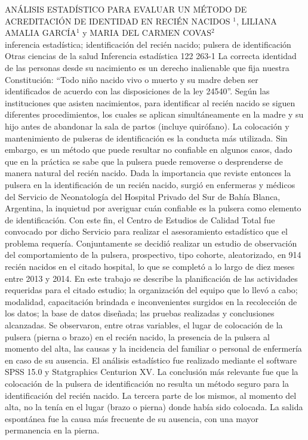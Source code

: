 \A
{ANÁLISIS ESTADÍSTICO PARA EVALUAR UN MÉTODO DE ACREDITACIÓN DE IDENTIDAD EN RECIÉN NACIDOS}
{$^1$, LILIANA AMALIA GARCÍA$^1$ y MARIA DEL CARMEN COVAS$^2$}
{
\\}
{inferencia estadística; identificación del recién nacido; pulsera de identificación} 
 {Otras ciencias de la salud} 
 {Inferencia estadística} 
 {122} 
 {263-1}
{La correcta identidad de las personas desde su nacimiento es un derecho inalienable que fija nuestra Constitución: “Todo niño nacido vivo o muerto y su madre deben ser identificados de acuerdo con las disposiciones de la ley 24540”. Según las instituciones que asisten nacimientos, para identificar al recién nacido se siguen diferentes procedimientos, los cuales se aplican simultáneamente en la madre y su hijo antes de abandonar la sala de partos (incluye quirófano). La colocación y mantenimiento de pulseras de identificación es la conducta más utilizada. Sin embargo, es un método que puede resultar no confiable en algunos casos, dado que en la práctica se sabe que la pulsera puede removerse o desprenderse de manera natural del recién nacido. Dada la importancia que reviste entonces la pulsera en la identificación de un recién nacido, surgió en enfermeras y médicos del Servicio de Neonatología del Hospital Privado del Sur de Bahía Blanca, Argentina, la inquietud por averiguar cuán confiable es la pulsera como elemento de identificación. Con este fin, el Centro de Estudios de Calidad Total fue convocado por dicho Servicio para realizar el asesoramiento estadístico que el problema requería. Conjuntamente se decidió realizar un estudio de observación del comportamiento de la pulsera, prospectivo, tipo cohorte, aleatorizado, en 914 recién nacidos en el citado hospital, lo que se completó a lo largo de diez meses entre 2013 y 2014. En este trabajo se describe la planificación de las actividades requeridas para el citado estudio; la organización del equipo que lo llevó a cabo; modalidad, capacitación brindada e inconvenientes surgidos en la recolección de los datos; la base de datos diseñada; las pruebas realizadas y conclusiones alcanzadas. Se observaron, entre otras variables, el lugar de colocación de la pulsera (pierna o brazo) en el recién nacido, la presencia de la pulsera al momento del alta, las causas y la incidencia del familiar o personal de enfermería en caso de su ausencia. El análisis estadístico fue realizado mediante el software SPSS 15.0 y Statgraphics Centurion XV. La conclusión más relevante fue que la colocación de la pulsera de identificación no resulta un método seguro para la identificación del recién nacido. La tercera parte de los mismos, al momento del alta, no la tenía en el lugar (brazo o pierna) donde había sido colocada. La salida espontánea fue la causa más frecuente de su ausencia, con una mayor permanencia en la pierna. }
